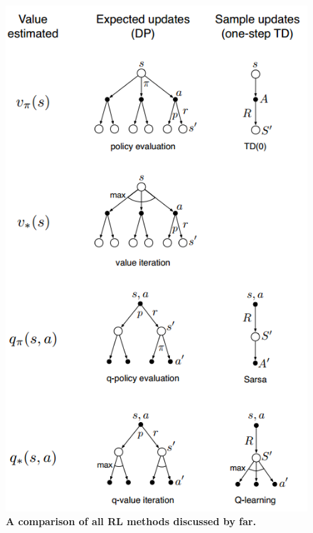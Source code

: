 \documentclass[11pt]{article}
\begin{document}
\begin{figure}
\begin{minipage}[t]{1\linewidth}
  \centering
  \centerline{\includegraphics[scale = 0.5]{backup_diag_updates.png}}
\end{minipage}
\caption{\footnotesize{\textbf{A comparison of all RL methods discussed by far. }}}
\label{fig: backup_diag_updates}
\end{figure}

\newpage


\end{document}

